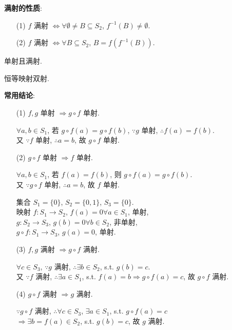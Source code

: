 \documentclass{note}
\begin{document}
\textbf{满射的性质}:
\begin{itemize}
    \item[(1)] $f$ 满射 $\Longleftrightarrow\forall\emptyset\neq B\subseteq S_2$, $f^{-1}(B)\neq\emptyset$.
    \item[(2)] $f$ 满射 $\Longleftrightarrow\forall B\subseteq S_2$, $B=f(f^{-1}(B))$.
\end{itemize}

\begin{df}[双射]
    单射且满射.
\end{df}

\begin{eg}
    恒等映射双射.
\end{eg}

\textbf{常用结论}:
\begin{itemize}
    \item[(1)] $f,g$ 单射 $\Longrightarrow g\circ f$ 单射.
    \begin{pf}
        $\forall a,b\in S_1$, 若 $g\circ f(a)=g\circ f(b)$, $\because g$ 单射, $\therefore f(a)=f(b)$.\\
        又 $\because f$ 单射, $\therefore a=b$, 故 $g\circ f$ 单射.
    \end{pf}
    \item[(2)] $g\circ f$ 单射 $\Longrightarrow f$ 单射.
    \begin{pf}
        $\forall a,b\in S_1$, 若 $f(a)=f(b)$, 则 $g\circ f(a)=g\circ f(b)$.\\
        又 $\because g\circ f$ 单射, $\therefore a=b$, 故 $f$ 单射.
    \end{pf}

    \begin{eg}
        集合 $S_1=\{0\}$, $S_2=\{0,1\}$, $S_3=\{0\}$.\\
        映射 $f:S_1\rightarrow S_2$, $f(a)=0\forall a\in S_1$, 单射,\\
        $g:S_2\rightarrow S_3$, $g(b)=0\forall b\in S_2$, 非单射,\\
        $g\circ f:S_1\rightarrow S_3$, $g(a)=0$, 单射.
    \end{eg}
    \item[(3)] $f,g$ 满射 $\Longrightarrow g\circ f$ 满射.
    \begin{pf}
        $\forall c\in S_3$, $\because g$ 满射, $\therefore\exists b\in S_2$, s.t. $g(b)=c$.\\
        又 $\because f$ 满射, $\therefore\exists a\in S_1$, s.t. $f(a)=b\Longrightarrow g\circ f(a)=c$, 故 $g\circ f$ 满射.
    \end{pf}
    \item[(4)] $g\circ f$ 满射 $\Longrightarrow g$ 满射.
    \begin{pf}
        $\because g\circ f$ 满射, $\therefore\forall c\in S_3$, $\exists a\in S_1$, s.t. $g\circ f(a)=c$\\
        $\Longrightarrow\exists b=f(a)\in S_2$, s.t. $g(b)=c$, 故 $g$ 满射.
    \end{pf}


\end{itemize}
\end{document}
